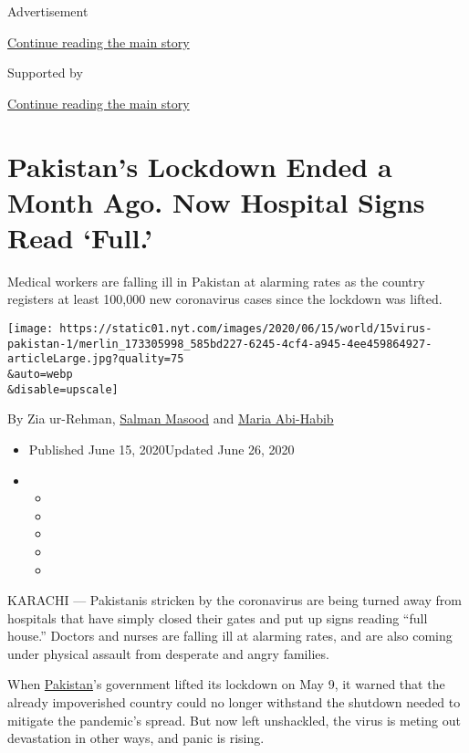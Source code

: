 Advertisement

\protect\hyperlink{after-top}{Continue reading the main story}

Supported by

\protect\hyperlink{after-sponsor}{Continue reading the main story}

\hypertarget{pakistans-lockdown-ended-a-month-ago-now-hospital-signs-read-full}{%
\section{Pakistan's Lockdown Ended a Month Ago. Now Hospital Signs Read
`Full.'}\label{pakistans-lockdown-ended-a-month-ago-now-hospital-signs-read-full}}

Medical workers are falling ill in Pakistan at alarming rates as the
country registers at least 100,000 new coronavirus cases since the
lockdown was lifted.

\texttt{[image: https://static01.nyt.com/images/2020/06/15/world/15virus-pakistan-1/merlin\_173305998\_585bd227-6245-4cf4-a945-4ee459864927-articleLarge.jpg?quality=75\\\&auto=webp\\\&disable=upscale]}

By Zia ur-Rehman, \href{https://www.nytimes.com/by/salman-masood}{Salman
Masood} and \href{https://www.nytimes.com/by/maria-abi-habib}{Maria
Abi-Habib}

\begin{itemize}
\item
  Published June 15, 2020Updated June 26, 2020
\item
  \begin{itemize}
  \item
  \item
  \item
  \item
  \item
  \end{itemize}
\end{itemize}

KARACHI --- Pakistanis stricken by the coronavirus are being turned away
from hospitals that have simply closed their gates and put up signs
reading ``full house.'' Doctors and nurses are falling ill at alarming
rates, and are also coming under physical assault from desperate and
angry families.

When
\href{https://www.nytimes.com/2020/06/29/world/asia/pakistan-stock-exchange-shooting.html}{Pakistan}'s
government lifted its lockdown on May 9, it warned that the already
impoverished country could no longer withstand the shutdown needed to
mitigate the pandemic's spread. But now left unshackled, the virus is
meting out devastation in other ways, and panic is rising.

